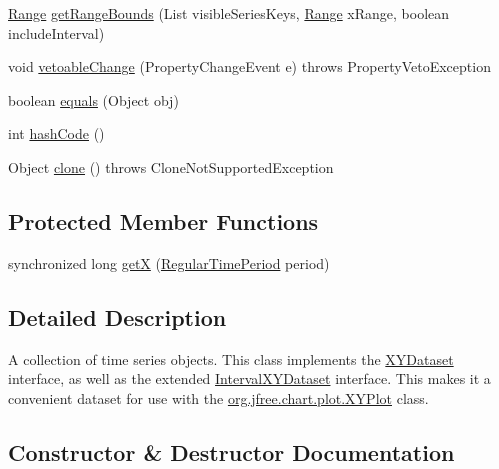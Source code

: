 \begin{DoxyCompactItemize}
\item 
\mbox{\hyperlink{classorg_1_1jfree_1_1data_1_1_range}{Range}} \mbox{\hyperlink{classorg_1_1jfree_1_1data_1_1time_1_1_time_series_collection_a20368e5f7344adff8aaaffe480de27b8}{get\+Range\+Bounds}} (List visible\+Series\+Keys, \mbox{\hyperlink{classorg_1_1jfree_1_1data_1_1_range}{Range}} x\+Range, boolean include\+Interval)
\item 
void \mbox{\hyperlink{classorg_1_1jfree_1_1data_1_1time_1_1_time_series_collection_a7cd62bf72fd6cc66c0851687fc41b747}{vetoable\+Change}} (Property\+Change\+Event e)  throws Property\+Veto\+Exception 
\item 
boolean \mbox{\hyperlink{classorg_1_1jfree_1_1data_1_1time_1_1_time_series_collection_a0a0c4bb544b6298019e8b65061c3a65a}{equals}} (Object obj)
\item 
int \mbox{\hyperlink{classorg_1_1jfree_1_1data_1_1time_1_1_time_series_collection_ab9158d2bf383a4dea0baaa16820293bb}{hash\+Code}} ()
\item 
Object \mbox{\hyperlink{classorg_1_1jfree_1_1data_1_1time_1_1_time_series_collection_a3577143a3f77c41124f05211c00662db}{clone}} ()  throws Clone\+Not\+Supported\+Exception 
\end{DoxyCompactItemize}
\subsection*{Protected Member Functions}
\begin{DoxyCompactItemize}
\item 
synchronized long \mbox{\hyperlink{classorg_1_1jfree_1_1data_1_1time_1_1_time_series_collection_a5cc2363473b0fcddadd219bba6fae88f}{getX}} (\mbox{\hyperlink{classorg_1_1jfree_1_1data_1_1time_1_1_regular_time_period}{Regular\+Time\+Period}} period)
\end{DoxyCompactItemize}


\subsection{Detailed Description}
A collection of time series objects. This class implements the \mbox{\hyperlink{}{X\+Y\+Dataset}} interface, as well as the extended \mbox{\hyperlink{}{Interval\+X\+Y\+Dataset}} interface. This makes it a convenient dataset for use with the \mbox{\hyperlink{classorg_1_1jfree_1_1chart_1_1plot_1_1_x_y_plot}{org.\+jfree.\+chart.\+plot.\+X\+Y\+Plot}} class. 

\subsection{Constructor \& Destructor Documentation}
\mbox{\label{classorg_1_1jfree_1_1data_1_1time_1_1_time_series_collection_a1c887fd4b91a94f77d9989f80683fcf7}} 
